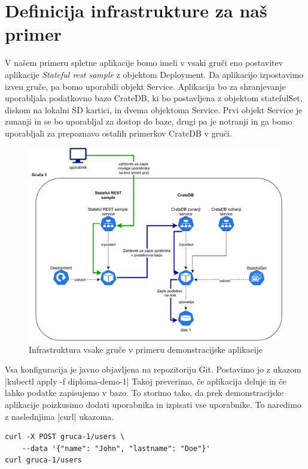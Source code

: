 \documentclass[a4paper, 12pt]{book}
\begin{document}
\section{Definicija infrastrukture za naš primer}
V našem primeru spletne aplikacije bomo imeli v vsaki gruči eno postavitev aplikacije \emph{Stateful rest sample} z objektom Deployment. 
Da aplikacijo izpostavimo izven gruče, pa bomo uporabili objekt Service.
Aplikacija bo za shranjevanje uporabljala podatkovno bazo CrateDB, ki bo postavljena z objektom statefulSet, diskom na lokalni SD kartici, in dvema objektoma Service.
Prvi objekt Service je zunanji in se bo uporabljal za dostop do baze, drugi pa je notranji in ga bomo uporabljali za prepoznavo ostalih primerkov CrateDB v gruči.
\begin{figure}[h]
\begin{center}
\includegraphics[width=1.0\textwidth]{images/infrastructure-example.pdf}
\end{center}
\caption{Infrastruktura vsake gruče v primeru demonstracijske aplikacije}
\label{infrastructure-example}
\end{figure}
Vsa konfiguracija je javno objavljena na repozitoriju Git\cite{git-diploma}.
Postavimo jo z ukazom \spverb|kubectl apply -f diploma-demo-1|
Takoj preverimo, če aplikacija deluje in če lahko podatke zapisujemo v bazo.
To storimo tako, da prek demonstracijske aplikacije poizkusimo dodati uporabnika in izpisati vse uporabnike.
To naredimo z naslednjima \spverb|curl| ukazoma.
\begin{verbatim}
curl -X POST gruca-1/users \
    --data '{"name": "John", "lastname": "Doe"}'
curl gruca-1/users
\end{verbatim}
\end{document}
